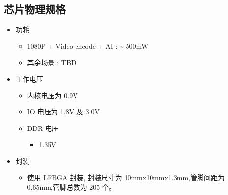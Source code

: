 \documentclass[letterpaper,10pt,english]{sphinxmanual}
\begin{document}
\subsection{芯片物理规格}
\label{\detokenize{contents/system-overview/features:id12}}\begin{itemize}
\item {} 
\sphinxAtStartPar
功耗
\begin{itemize}
\item {} 
\sphinxAtStartPar
1080P + Video encode + AI : \textasciitilde{} 500mW

\item {} 
\sphinxAtStartPar
其余场景 : TBD

\end{itemize}

\item {} 
\sphinxAtStartPar
工作电压
\begin{itemize}
\item {} 
\sphinxAtStartPar
内核电压为 0.9V

\item {} 
\sphinxAtStartPar
IO 电压为 1.8V 及 3.0V

\item {} 
\sphinxAtStartPar
DDR 电压
\begin{itemize}
\item {} 
\sphinxAtStartPar
1.35V

\end{itemize}

\end{itemize}

\item {} 
\sphinxAtStartPar
封装
\begin{itemize}
\item {} 
\sphinxAtStartPar
使用 LFBGA 封装, 封装尺寸为 10mmx10mmx1.3mm,管脚间距为 0.65mm,管脚总数为 205 个。

\end{itemize}

\end{itemize}



\renewcommand{\indexname}{索引}
\printindex
\end{document}
